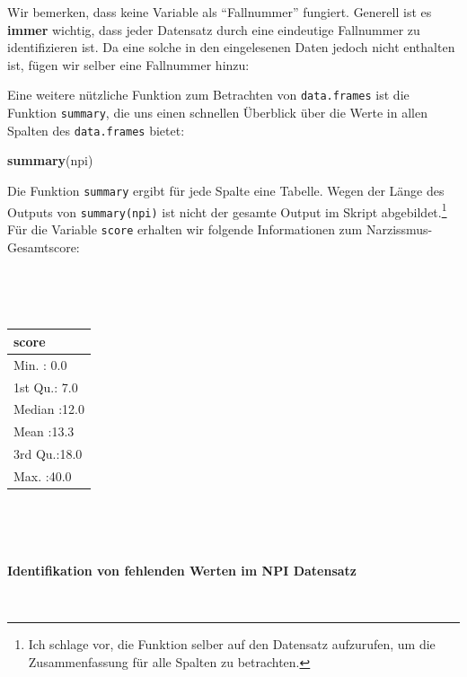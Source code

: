 \documentclass[12pt,]{tufte-book}
\newenvironment{Shaded}{\begin{snugshade}}{\end{snugshade}}
\newcommand{\KeywordTok}[1]{\textcolor[rgb]{0.13,0.29,0.53}{\textbf{#1}}}
\newcommand{\DecValTok}[1]{\textcolor[rgb]{0.00,0.00,0.81}{#1}}
\newcommand{\StringTok}[1]{\textcolor[rgb]{0.31,0.60,0.02}{#1}}
\newcommand{\OperatorTok}[1]{\textcolor[rgb]{0.81,0.36,0.00}{\textbf{#1}}}
\newcommand{\NormalTok}[1]{#1}
\theoremstyle{definition}
\theoremstyle{definition}
\theoremstyle{definition}
\theoremstyle{remark}
\begin{document}
Wir bemerken, dass keine Variable als ``Fallnummer'' fungiert. Generell
ist es \textbf{immer} wichtig, dass jeder Datensatz durch eine
eindeutige Fallnummer zu identifizieren ist. Da eine solche in den
eingelesenen Daten jedoch nicht enthalten ist, fügen wir selber eine
Fallnummer hinzu:

\begin{Shaded}
\end{Shaded}

Eine weitere nützliche Funktion zum Betrachten von \texttt{data.frames}
ist die Funktion \texttt{summary}, die uns einen schnellen Überblick
über die Werte in allen Spalten des \texttt{data.frames} bietet:

\begin{Shaded}
\begin{Highlighting}[]
\KeywordTok{summary}\NormalTok{(npi)}
\end{Highlighting}
\end{Shaded}

Die Funktion \texttt{summary} ergibt für jede Spalte eine Tabelle. Wegen
der Länge des Outputs von \texttt{summary(npi)} ist nicht der gesamte
Output im Skript abgebildet.\footnote{Ich schlage vor, die Funktion
  selber auf den Datensatz aufzurufen, um die Zusammenfassung für alle
  Spalten zu betrachten.} Für die Variable \texttt{score} erhalten wir
folgende Informationen zum Narzissmus-Gesamtscore:

~

~

\begin{tabular}{l}
\hline
score\\
\hline
Min.   : 0.0\\
\hline
1st Qu.: 7.0\\
\hline
Median :12.0\\
\hline
Mean   :13.3\\
\hline
3rd Qu.:18.0\\
\hline
Max.   :40.0\\
\hline
\end{tabular}

~

~

\textbf{Identifikation von fehlenden Werten im NPI Datensatz}

~
\end{document}
